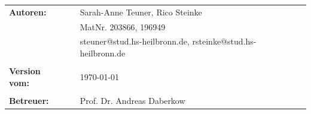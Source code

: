 \begin{titlepage}
\begin{verbatim}
\end{verbatim}
\begin{flushleft}
\begin{tabular}{llll}
\textbf{Autoren:} 		& & Sarah-Anne Teuner, Rico Steinke 							& \\
		 				& & MatNr. 203866, 196949 							& \\
		 				& & steuner@stud.hs-heilbronn.de, rsteinke@stud.hs-heilbronn.de				& \\
		 				& & \\
\textbf{Version vom:}	& & \today 									&\\
						& & \\
\textbf{Betreuer:} 	& & Prof. Dr. Andreas Daberkow		&\\
\end{tabular}
\end{flushleft}
\end{titlepage}